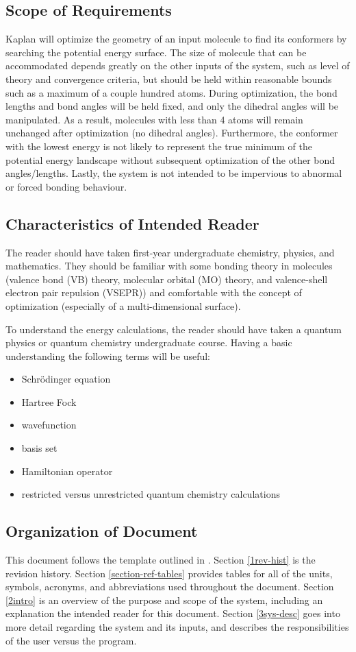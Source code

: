 \documentclass[12pt]{article}
\begin{document}
\subsection{Scope of Requirements}
Kaplan will optimize the geometry of an input molecule 
to find its conformers 
by searching the potential energy surface. The size of molecule that can be 
accommodated depends greatly on the other inputs of the system, such as level 
of theory and convergence criteria, but should be held within reasonable bounds 
such as a maximum of a couple hundred atoms. During 
optimization, the bond 
lengths and bond angles will be held fixed, and only 
the dihedral angles will 
be manipulated. As a result, molecules with less than 4 atoms will remain 
unchanged after optimization (no dihedral angles). 
Furthermore, the conformer 
with the lowest energy is not likely to represent the true minimum  of the 
potential energy landscape without subsequent 
optimization of the other bond 
angles/lengths. Lastly, the system is not intended to be impervious to abnormal 
or forced bonding behaviour.

\subsection{Characteristics of Intended Reader} 
The reader should have taken first-year undergraduate chemistry, physics, and 
mathematics. They should be familiar with some bonding theory in molecules 
(valence bond (VB) theory, molecular orbital (MO) theory, and valence-shell 
electron pair repulsion (VSEPR)) and comfortable with the concept of 
optimization (especially of a multi-dimensional 
surface). 

To understand the energy calculations, the reader should have taken a quantum 
physics or quantum chemistry undergraduate course. Having a basic understanding 
the following terms will be useful:
\begin{itemize}
	\item Schr\"{o}dinger equation
	\item Hartree Fock
	\item wavefunction
	\item basis set
	\item Hamiltonian operator
	\item restricted versus unrestricted quantum chemistry calculations
\end{itemize}

\subsection{Organization of Document}
This document follows the template outlined in \cite{SmithAndLai2005}. Section 
\ref{1rev-hist} is the revision history. Section \ref{section-ref-tables} 
provides tables for all of the units, symbols, acronyms, and 
abbreviations used throughout the document. Section \ref{2intro} is an overview 
of the purpose and scope of the system, including an 
explanation the intended 
reader for this document. Section \ref{3sys-desc} goes into more detail 
regarding the system and its inputs, and describes the responsibilities of the 
user versus the program. 
\end{document}
